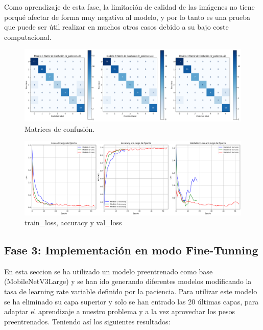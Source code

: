 \quad

\noindent
Como aprendizaje de esta fase, la limitación de calidad de las imágenes no tiene porqué afectar
de forma muy negativa al modelo, y por lo tanto es una prueba que puede ser útil realizar en muchos 
otros casos debido a su bajo coste computacional.
\quad

\begin{figure}[H]
    \centering
    \centering
    \includegraphics[width=\textwidth]{imagenes/confusion_matrix_a_quitar.png}
    \caption{Matrices de confusión.}
    \label{fig:confusion_matrix}
\end{figure}

\begin{figure}[H]
    \centering
    \centering
    \includegraphics[width=\textwidth]{imagenes/loss_accuracy_validation_a_quitar.png}
    \caption{train\_loss, accuracy y val\_loss}
    \label{fig:loss_accuracy_validation}
\end{figure}


\subsection{Fase 3: Implementación en modo Fine-Tunning}

\noindent
En esta seccion se ha utilizado un modelo preentrenado como base (MobileNetV3Large) y se han
ido generando diferentes modelos modificando la tasa de learning rate variable definido por la paciencia. Para utilizar este modelo se ha eliminado su capa superior y solo se han entrado las 20 últimas capas, para adaptar el aprendizaje a nuestro problema y a la vez aprovechar los pesos preentrenados.
Teniendo así los siguientes resultados:


